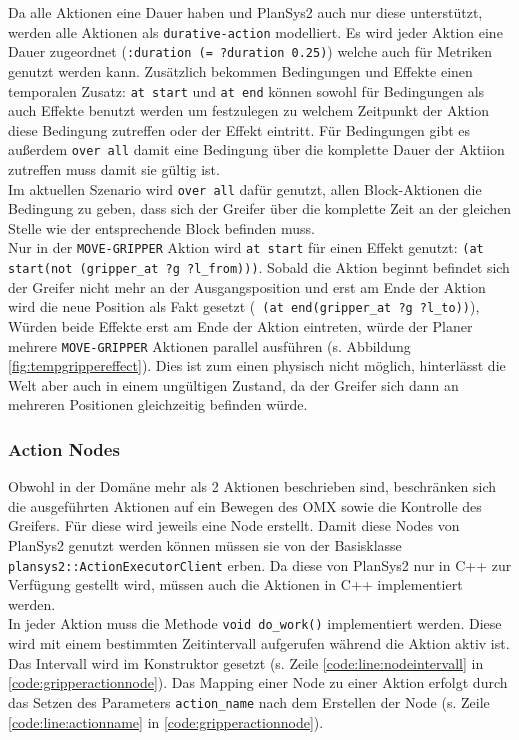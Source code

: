 Da alle Aktionen eine Dauer haben und \ac{PlanSys2} auch nur diese unterstützt, werden alle Aktionen als \verb|durative-action| modelliert. Es wird jeder Aktion eine Dauer zugeordnet (\verb|:duration (= ?duration 0.25)|) welche auch für Metriken genutzt werden kann. Zusätzlich bekommen Bedingungen und Effekte einen temporalen Zusatz: \verb|at start| und \verb|at end| können sowohl für Bedingungen als auch Effekte benutzt werden um festzulegen zu welchem Zeitpunkt der Aktion diese Bedingung zutreffen oder der Effekt eintritt. Für Bedingungen gibt es außerdem \verb|over all| damit eine Bedingung über die komplette Dauer der Aktiion zutreffen muss damit sie gültig ist.\\
Im aktuellen Szenario wird \verb|over all| dafür genutzt, allen Block-Aktionen die Bedingung zu geben, dass sich der Greifer über die komplette Zeit an der gleichen Stelle wie der entsprechende Block befinden muss.\\
Nur in der \verb|MOVE-GRIPPER| Aktion wird \verb|at start| für einen Effekt genutzt: \verb|(at start(not (gripper_at ?g ?l_from)))|. Sobald die Aktion beginnt befindet sich der Greifer nicht mehr an der Ausgangsposition und erst am Ende der Aktion wird die neue Position als Fakt gesetzt (\verb| (at end(gripper_at ?g ?l_to))|), Würden beide Effekte erst am Ende der Aktion eintreten, würde der Planer mehrere \verb|MOVE-GRIPPER| Aktionen parallel ausführen (s. Abbildung \ref{fig:tempgrippereffect}). Dies ist zum einen physisch nicht möglich, hinterlässt die Welt aber auch in einem ungültigen Zustand, da der Greifer sich dann an mehreren Positionen gleichzeitig befinden würde.



\subsubsection{Action Nodes}
Obwohl in der Domäne mehr als 2 Aktionen beschrieben sind, beschränken sich die ausgeführten Aktionen auf ein Bewegen des OMX sowie die Kontrolle des Greifers. Für diese wird jeweils eine Node erstellt. Damit diese Nodes von \ac{PlanSys2} genutzt werden können müssen sie von der Basisklasse \verb|plansys2::ActionExecutorClient| erben. Da diese von \ac{PlanSys2} nur in C++ zur Verfügung gestellt wird, müssen auch die Aktionen in C++ implementiert werden.\\
In jeder Aktion muss die Methode \verb|void do_work()| implementiert werden. Diese wird mit einem bestimmten Zeitintervall aufgerufen während die Aktion aktiv ist. Das Intervall wird im Konstruktor gesetzt (s. Zeile \ref{code:line:nodeintervall} in \ref{code:gripperactionnode}). Das Mapping einer Node zu einer Aktion erfolgt durch das Setzen des Parameters \verb|action_name| nach dem Erstellen der Node (s. Zeile \ref{code:line:actionname} in \ref{code:gripperactionnode}).



